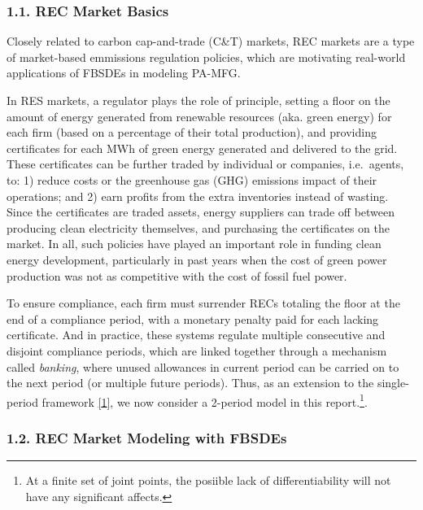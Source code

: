 \documentclass[
]{article}
\begin{document}
\hypertarget{rec-market-basics}{%
\subsubsection{1.1. REC Market Basics}\label{rec-market-basics}}

Closely related to carbon cap-and-trade (C\&T) markets, REC markets are
a type of market-based emmissions regulation policies, which are
motivating real-world applications of FBSDEs in modeling PA-MFG.

In RES markets, a regulator plays the role of principle, setting a floor
on the amount of energy generated from renewable resources (aka. green
energy) for each firm (based on a percentage of their total production),
and providing certificates for each MWh of green energy generated and
delivered to the grid. These certificates can be further traded by
individual or companies, i.e.~agents, to: 1) reduce costs or the
greenhouse gas (GHG) emissions impact of their operations; and 2) earn
profits from the extra inventories instead of wasting. Since the
certificates are traded assets, energy suppliers can trade off between
producing clean electricity themselves, and purchasing the certificates
on the market. In all, such policies have played an important role in
funding clean energy development, particularly in past years when the
cost of green power production was not as competitive with the cost of
fossil fuel power.

To ensure compliance, each firm must surrender RECs totaling the floor
at the end of a compliance period, with a monetary penalty paid for each
lacking certificate. And in practice, these systems regulate multiple
consecutive and disjoint compliance periods, which are linked together
through a mechanism called \emph{banking}, where unused allowances in
current period can be carried on to the next period (or multiple future
periods). Thus, as an extension to the single-period framework
\href{\%22https://doi.org/10.48550/arXiv.2110.01127\%22}{{[}1{]}}, we
now consider a 2-period model in this report.\footnote{At a finite set
  of joint points, the posiible lack of differentiability will not have
  any significant affects.}.

\hypertarget{rec-market-modeling-with-fbsdes}{%
\subsubsection{1.2. REC Market Modeling with
FBSDEs}\label{rec-market-modeling-with-fbsdes}}
\end{document}
